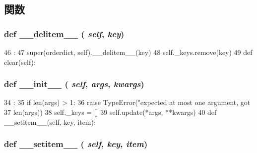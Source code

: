 \subsection{関数}
\hypertarget{classm5_1_1util_1_1orderdict_1_1orderdict_a5fa6cfe34d7e2fe5b9c38e1d74fffac8}{
\subsubsection[{\_\-\_\-delitem\_\-\_\-}]{\setlength{\rightskip}{0pt plus 5cm}def \_\-\_\-delitem\_\-\_\- ( {\em self}, \/   {\em key})}}
\label{classm5_1_1util_1_1orderdict_1_1orderdict_a5fa6cfe34d7e2fe5b9c38e1d74fffac8}



\begin{DoxyCode}
46                               :
47         super(orderdict, self).__delitem__(key)
48         self._keys.remove(key)
49 
    def clear(self):
\end{DoxyCode}
\hypertarget{classm5_1_1util_1_1orderdict_1_1orderdict_ac775ee34451fdfa742b318538164070e}{
\subsubsection[{\_\-\_\-init\_\-\_\-}]{\setlength{\rightskip}{0pt plus 5cm}def \_\-\_\-init\_\-\_\- ( {\em self}, \/   {\em args}, \/   {\em kwargs})}}
\label{classm5_1_1util_1_1orderdict_1_1orderdict_ac775ee34451fdfa742b318538164070e}



\begin{DoxyCode}
34                                        :
35         if len(args) > 1:
36             raise TypeError("expected at most one argument, got %
37                             len(args))
38         self._keys = []
39         self.update(*args, **kwargs)
40 
    def __setitem__(self, key, item):
\end{DoxyCode}
\hypertarget{classm5_1_1util_1_1orderdict_1_1orderdict_a09195b01147e970ca71c48b57f653940}{
\subsubsection[{\_\-\_\-setitem\_\-\_\-}]{\setlength{\rightskip}{0pt plus 5cm}def \_\-\_\-setitem\_\-\_\- ( {\em self}, \/   {\em key}, \/   {\em item})}}
\label{classm5_1_1util_1_1orderdict_1_1orderdict_a09195b01147e970ca71c48b57f653940}



